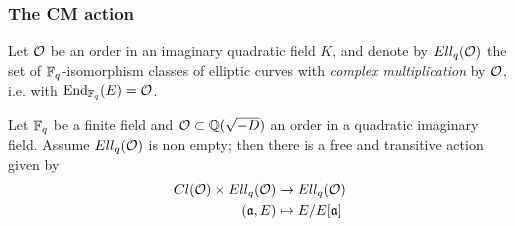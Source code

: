 \documentclass{beamer}
\begin{document}
    \begin{frame}
        \frametitle{The CM action}
        
        \begin{definition}
            Let $\mathcal{O}$ be an order in an imaginary quadratic field $K$, and denote by $Ell_q(\mathcal{O})$ the set of $\mathbb{F}_q$-isomorphism classes of elliptic curves with \emph{complex multiplication} by $\mathcal{O}$, i.e. with $\operatorname{End}_{\mathbb{F}_q}(E)=\mathcal{O}$.
        \end{definition}
        
        \begin{theorem}
            Let $\mathbb{F}_q$ be a finite field and $\mathcal{O}\subset\mathbb{Q}(\sqrt{-D})$ an order in a quadratic imaginary field. Assume $Ell_q(\mathcal{O})$ is non empty; then there is a free and transitive action given by
            \begin{align*}
            Cl(\mathcal{O})\times Ell_q(\mathcal{O}) & \to  Ell_q(\mathcal{O})\\
            (\mathfrak{a}, E) & \mapsto  E/E[\mathfrak{a}]
            \end{align*}
        \end{theorem}
    
    \end{frame}
\end{document}
